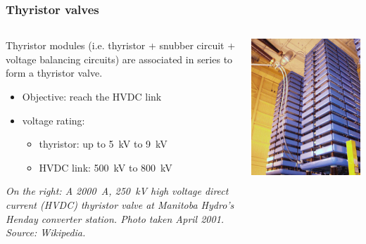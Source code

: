 \begin{frame}
\frametitle{Thyristor valves}
\begin{columns}
\begin{column}{0.5\linewidth}
Thyristor modules (i.e. thyristor + snubber circuit + voltage balancing circuits) are associated in series to form a thyristor valve.
\begin{itemize}
    \item Objective: reach the HVDC link
    \item voltage rating:
    \begin{itemize}
        \item thyristor: up to \SI{5}{kV} to \SI{9}{kV}
        \item HVDC link: \SI{500}{kV} to \SI{800}{kV}
    \end{itemize}
\end{itemize}
\vspace{2mm}
\textit{On the right: A \SI{2000}{A}, \SI{250}{kV} high voltage direct current (HVDC) thyristor valve at Manitoba Hydro's Henday converter station. Photo taken April 2001. Source: Wikipedia.}
\end{column}
\begin{column}{0.5\linewidth}
\begin{center}
    \includegraphics[width=0.7\linewidth]{images/Manitoba_Hydro-BipoleII_Valve.jpg}
\end{center}

\end{column}
\end{columns}
\end{frame}




